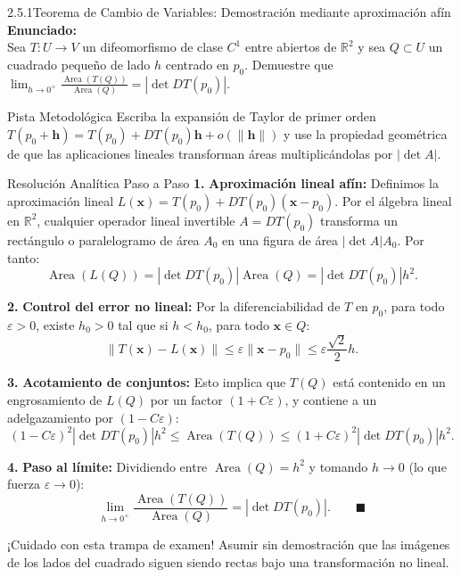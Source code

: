 \documentclass[11pt,a4paper]{article}
\begin{document}
\begin{nivelbox}{2.5.1}{Teorema de Cambio de Variables: Demostración mediante aproximación afín}
\textbf{Enunciado:}\\
Sea $T: U \to V$ un difeomorfismo de clase $C^1$ entre abiertos de $\mathbb{R}^2$ y sea $Q \subset U$ un cuadrado pequeño de lado $h$ centrado en $p_0$. Demuestre que $\lim_{h \to 0^+} \frac{\operatorname{Area}(T(Q))}{\operatorname{Area}(Q)} = |\det DT(p_0)|$.

\begin{observacionbox}{Pista Metodológica}
Escriba la expansión de Taylor de primer orden $T(p_0 + \mathbf{h}) = T(p_0) + DT(p_0)\mathbf{h} + o(\|\mathbf{h}\|)$ y use la propiedad geométrica de que las aplicaciones lineales transforman áreas multiplicándolas por $|\det A|$.
\end{observacionbox}

\begin{ejerciciobox}{Resolución Analítica Paso a Paso}
\smallskip\noindent\textbf{1.} \textbf{Aproximación lineal afín:}
Definimos la aproximación lineal $L(\mathbf{x}) = T(p_0) + DT(p_0)(\mathbf{x} - p_0)$.
Por el álgebra lineal en $\mathbb{R}^2$, cualquier operador lineal invertible $A = DT(p_0)$ transforma un rectángulo o paralelogramo de área $A_0$ en una figura de área $|\det A| A_0$. Por tanto:
\[\operatorname{Area}(L(Q)) = |\det DT(p_0)| \operatorname{Area}(Q) = |\det DT(p_0)| h^2.\]

\smallskip\noindent\textbf{2.} \textbf{Control del error no lineal:}
Por la diferenciabilidad de $T$ en $p_0$, para todo $\varepsilon > 0$, existe $h_0 > 0$ tal que si $h < h_0$, para todo $\mathbf{x} \in Q$:
\[\|T(\mathbf{x}) - L(\mathbf{x})\| \le \varepsilon \|\mathbf{x} - p_0\| \le \varepsilon \frac{\sqrt{2}}{2} h.\]

\smallskip\noindent\textbf{3.} \textbf{Acotamiento de conjuntos:}
Esto implica que $T(Q)$ está contenido en un engrosamiento de $L(Q)$ por un factor $(1 + C\varepsilon)$, y contiene a un adelgazamiento por $(1 - C\varepsilon)$:
\[(1 - C\varepsilon)^2 |\det DT(p_0)| h^2 \le \operatorname{Area}(T(Q)) \le (1 + C\varepsilon)^2 |\det DT(p_0)| h^2.\]

\smallskip\noindent\textbf{4.} \textbf{Paso al límite:}
Dividiendo entre $\operatorname{Area}(Q) = h^2$ y tomando $h \to 0$ (lo que fuerza $\varepsilon \to 0$):
\[\lim_{h \to 0^+} \frac{\operatorname{Area}(T(Q))}{\operatorname{Area}(Q)} = |\det DT(p_0)|. \qquad \blacksquare\]
\end{ejerciciobox}

\begin{errorbox}{¡Cuidado con esta trampa de examen!}
Asumir sin demostración que las imágenes de los lados del cuadrado siguen siendo rectas bajo una transformación no lineal.
\end{errorbox}
\end{nivelbox}
\bigskip
\end{document}
